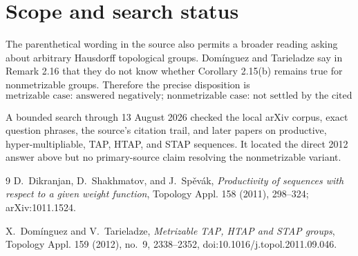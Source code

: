 \documentclass[11pt]{article}
\begin{document}
\section{Scope and search status}

The parenthetical wording in the source also permits a broader reading asking
about arbitrary Hausdorff topological groups.  Dom\'inguez and Tarieladze say
in Remark 2.16 that they do not know whether Corollary 2.15(b) remains true for
nonmetrizable groups.  Therefore the precise disposition is
\[
 \boxed{\text{metrizable case: answered negatively; nonmetrizable case:
 not settled by the cited theorem.}}
\]

A bounded search through 13 August 2026 checked the local arXiv corpus, exact
question phrases, the source's citation trail, and later papers on productive,
hyper-multipliable, TAP, HTAP, and STAP sequences.  It located the direct 2012
answer above but no primary-source claim resolving the nonmetrizable variant.

\begin{thebibliography}{9}
D.~Dikranjan, D.~Shakhmatov, and J.~Sp\v{e}v\'ak,
\emph{Productivity of sequences with respect to a given weight function},
Topology Appl. 158 (2011), 298--324; arXiv:1011.1524.

X.~Dom\'inguez and V.~Tarieladze,
\emph{Metrizable TAP, HTAP and STAP groups},
Topology Appl. 159 (2012), no.~9, 2338--2352,
doi:10.1016/j.topol.2011.09.046.
\end{thebibliography}
\end{document}

